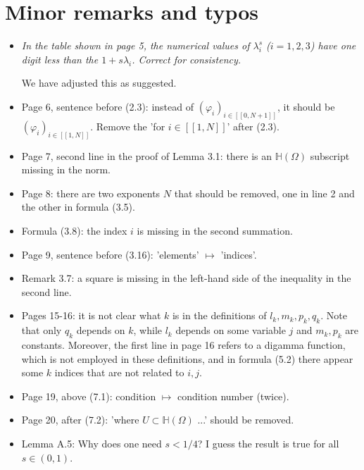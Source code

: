 \documentclass[11 pt]{article}
\numberwithin{equation}{section}
\begin{document}
\section*{Minor remarks and typos}

\begin{itemize}
    \item \emph{In the table shown in page 5, the numerical values of \(\lambda_{i}^{s}\) (\(i=1,2,3\)) have one digit less than the \(1+s\lambda_{i}\). Correct for consistency.}

    We have adjusted this as suggested.

    \item Page 6, sentence before (2.3): instead of \((\varphi_{i})_{i\in[[0,N+1]]}\), it should be \((\varphi_{i})_{i\in[[1,N]]}\). Remove the 'for \(i\in[[1,N]]\)' after (2.3).
    \item Page 7, second line in the proof of Lemma 3.1: there is an \({\mathbb{H}}(\Omega)\) subscript missing in the norm.
    \item Page 8: there are two exponents \(N\) that should be removed, one in line 2 and the other in formula (3.5).
    \item Formula (3.8): the index \(i\) is missing in the second summation.
    \item Page 9, sentence before (3.16): 'elements' \(\mapsto\) 'indices'.
    \item Remark 3.7: a square is missing in the left-hand side of the inequality in the second line.
    \item Pages 15-16: it is not clear what \(k\) is in the definitions of \(l_{k},m_{k},p_{k},q_{k}\). Note that only \(q_{k}\) depends on \(k\), while \(l_{k}\) depends on some variable \(j\) and \(m_{k},p_{k}\) are constants. Moreover, the first line in page 16 refers to a digamma function, which is not employed in these definitions, and in formula (5.2) there appear some \(k\) indices that are not related to \(i,j\).
    \item Page 19, above (7.1): condition \(\mapsto\) condition number (twice).
    \item Page 20, after (7.2): 'where \(U\subset{\mathbb{H}}(\Omega)\) ...' should be removed.
    \item Lemma A.5: Why does one need \(s<1/4\)? I guess the result is true for all \(s\in(0,1)\).
\end{itemize}
\end{document}
